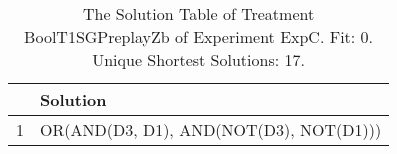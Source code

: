 \begin{table}[ht]
\centering
\begin{tabular}{rp{9cm}}
  \hline
 & Solution \\ 
  \hline
1 & OR(AND(D3, D1), AND(NOT(D3), NOT(D1))) \\ 
   \hline
\end{tabular}
\caption{The Solution Table of Treatment BoolT1SGPreplayZb of Experiment ExpC. Fit: 0. Unique Shortest Solutions: 17.} 
\end{table}

